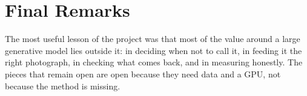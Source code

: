 \section{Final Remarks}

The most useful lesson of the project was that most of the value around a large generative model lies outside it: in deciding when not to call it, in feeding it the right photograph, in checking what comes back, and in measuring honestly. The pieces that remain open are open because they need data and a GPU, not because the method is missing.
